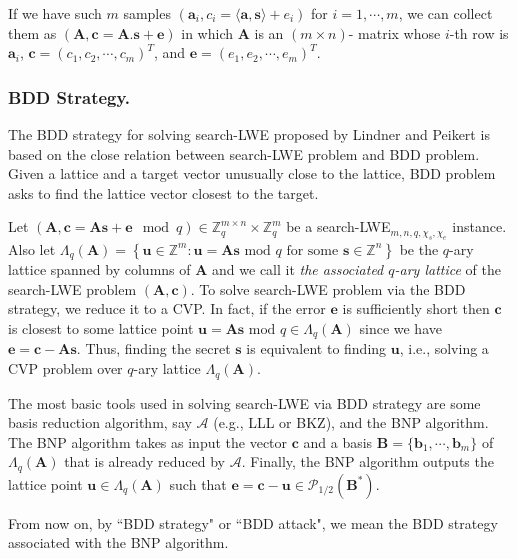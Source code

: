 \documentclass[runningheads]{llncs}
\begin{document}
	If we have such $m$ samples $(\mathbf{a}_i,c_i=\langle \mathbf{a}, \mathbf{s}\rangle +e_i)$ for $i=1,\cdots,m$, we can collect them as  $(\mathbf{A},\mathbf{c}=\mathbf{A}.\mathbf{s}+\mathbf{e})$ in which $\mathbf{A}$ is an $(m \times n)$- matrix whose $i$-th row is $\mathbf{a}_i$, $\mathbf{c}=(c_1,c_2,\cdots,c_m)^T$, and $\mathbf{e}=(e_1,e_2,\cdots,e_m)^T$.
	
\subsubsection{BDD Strategy.} 
The BDD strategy for solving search-LWE proposed by Lindner and Peikert \cite{LP11} is based on the close relation between search-LWE problem and BDD problem. Given a lattice and a target vector unusually close to the lattice, BDD problem asks to find the lattice vector closest to the target. 

Let $(\mathbf{A}, \mathbf{c}=\mathbf{A}\mathbf{s}+\mathbf{e} \mod q) \in \mathbb{Z}_q^{m \times n} \times \mathbb{Z}_q^m$  be a search-LWE$_{m,n,q,\chi_s, \chi_e}$ instance. Also let $\Lambda_q{(\mathbf{A})}=\left\{ \mathbf{u} \in \mathbb{Z}^m: \mathbf{u}=\mathbf{A}\mathbf{s} \text{ mod } q \text{ for some } \mathbf{s} \in \mathbb{Z}^n \right\}$ be  the $q$-ary lattice spanned by columns of $\mathbf{A}$ and we call it \textit{the associated $q$-ary lattice} of the search-LWE problem $(\mathbf{A}, \mathbf{c})$. To solve search-LWE problem via the BDD strategy, we reduce it to a CVP. In fact, if the error $\mathbf{e}$ is sufficiently short then $\mathbf{c}$ is closest to some lattice point $\mathbf{u}=\mathbf{A}\mathbf{s} \text{ mod } q \in \Lambda_q(\mathbf{A})$ since we have $\mathbf{e}=\mathbf{c}-\mathbf{A}\mathbf{s}.$  Thus, finding the secret $\mathbf{s}$ is equivalent to finding $\mathbf{u}$, i.e., solving a CVP problem over $q$-ary lattice $\Lambda_q{(\mathbf{A})}$.

The most basic tools used in solving search-LWE via BDD strategy are some basis reduction algorithm, say $\mathcal{A}$ (e.g., LLL or BKZ), and the BNP algorithm. The BNP algorithm takes as input the vector  $\mathbf{c}$  and a basis $\mathbf{B}=\{ \mathbf{b}_1,\cdots,\mathbf{b}_{m}\}$ of  $\Lambda_q(\mathbf{A})$ that is already reduced by $\mathcal{A}$. Finally, the BNP algorithm outputs the lattice point $\mathbf{u} \in \Lambda_q(\mathbf{A})$ such that $\mathbf{e}=\mathbf{c}-\mathbf{u} \in\mathcal{P}_{1/2}(\mathbf{B^*}) $. 

From now on, by ``BDD strategy" or ``BDD attack", we mean the BDD strategy associated with the BNP algorithm. 
\end{document}
